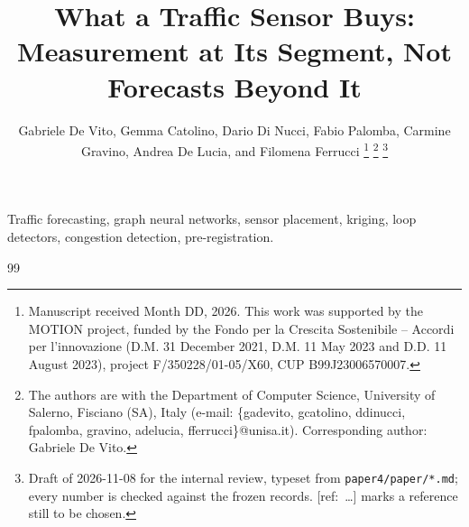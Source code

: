 \documentclass[lettersize,journal]{IEEEtran}
\begin{document}
\title{What a Traffic Sensor Buys: Measurement at Its Segment, Not Forecasts Beyond It}
\author{Gabriele De Vito, Gemma Catolino, Dario Di Nucci, Fabio Palomba, Carmine Gravino, Andrea De Lucia, and Filomena Ferrucci%
\thanks{Manuscript received Month DD, 2026. This work was supported by the MOTION project, funded by the Fondo per la Crescita Sostenibile -- Accordi per l'innovazione (D.M. 31 December 2021, D.M. 11 May 2023 and D.D. 11 August 2023), project F/350228/01-05/X60, CUP B99J23006570007.}%
\thanks{The authors are with the Department of Computer Science, University of Salerno, Fisciano (SA), Italy (e-mail: \{gadevito, gcatolino, ddinucci, fpalomba, gravino, adelucia, fferrucci\}@unisa.it). Corresponding author: Gabriele De Vito.}%
\thanks{Draft of 2026-11-08 for the internal review, typeset from \texttt{paper4/paper/*.md}; every number is checked against the frozen records. [ref:~\ldots] marks a reference still to be chosen.}}
\maketitle
\begin{abstract}

\end{abstract}
\begin{IEEEkeywords}
Traffic forecasting, graph neural networks, sensor placement, kriging, loop detectors, congestion detection, pre-registration.
\end{IEEEkeywords}














\begin{thebibliography}{99}
\footnotesize

\end{thebibliography}



\end{document}
